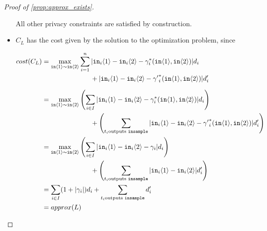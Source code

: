 \begin{proof}[Proof of \ref{prop:approx_exists}]
\begin{itemize}
        All other privacy constraints are satisfied by construction.

        \item $C_L$ has the cost given by the solution to the optimization problem, since
        
        \begin{align*}
            cost(C_L) &= \max_{\texttt{in}\brangle{1}\sim \texttt{in}\brangle{2}} \sum_{i = 1}^n  |\texttt{in}_i\brangle{1} - \texttt{in}_i\brangle{2} - \gamma_i^*(\texttt{in}\brangle{1}, \texttt{in}\brangle{2})| d_i \\ 
            \phantom{cost(C_L)} &\phantom{=\max_{\texttt{in}\brangle{1}\sim \texttt{in}\brangle{2}}\qquad } + |\texttt{in}_i\brangle{1} - \texttt{in}_i\brangle{2} - {\gamma'}_i^*(\texttt{in}\brangle{1}, \texttt{in}\brangle{2})|d_i' \\
            &= \max_{\texttt{in}\brangle{1}\sim \texttt{in}\brangle{2}} \left(\sum_{i \in I} |\texttt{in}_i\brangle{1} - \texttt{in}_i\brangle{2} - \gamma_i^*(\texttt{in}\brangle{1}, \texttt{in}\brangle{2})| d_i\right) \\
            \phantom{cost(C_L)} &\phantom{=\max_{\texttt{in}\brangle{1}\sim \texttt{in}\brangle{2}}\qquad } + \left(\sum_{t_i \text{outputs \texttt{insample}}}|\texttt{in}_i\brangle{1} - \texttt{in}_i\brangle{2} - {\gamma'}_i^*(\texttt{in}\brangle{1}, \texttt{in}\brangle{2})|d_i'\right)\\
            &= \max_{\texttt{in}\brangle{1}\sim \texttt{in}\brangle{2}} \left(\sum_{i \in I} |\texttt{in}_i\brangle{1} - \texttt{in}_i\brangle{2} - \gamma_i| d_i\right) \\
            \phantom{cost(C_L)} &\phantom{=\max_{\texttt{in}\brangle{1}\sim \texttt{in}\brangle{2}}\qquad } + \left(\sum_{t_i \text{outputs \texttt{insample}}}|\texttt{in}_i\brangle{1} - \texttt{in}_i\brangle{2}|d_i'\right)\\
            &= \sum_{i \in I} (1 + |\gamma_i|) d_i + \sum_{t_i \text{outputs \texttt{insample}}} d_i' \\
            &= approx(L)
        \end{align*}
    \end{itemize}
\end{proof}

